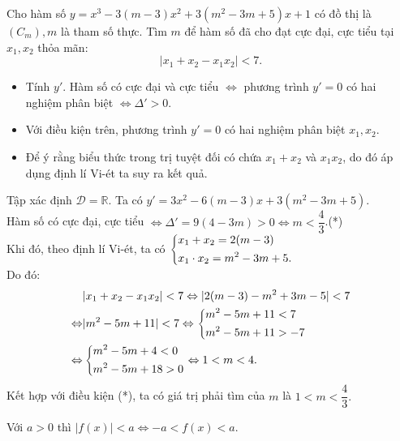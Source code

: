 \begin{bt}%
	Cho hàm số $y=x^3-3(m-3)x^2+3(m^2-3m+5)x+1$ có đồ thị là $(C_m), m$ là tham số thực. Tìm $m$ để hàm số đã cho đạt cực đại, cực tiểu tại $x_1, x_2$ thỏa mãn:
	$$|x_1 + x_2 - x_1x_2| < 7.$$
	\loigiai
	{
		\begin{itemize}
			\item Tính $y'$. Hàm số có cực đại và cực tiểu $\Leftrightarrow$ phương trình $y'=0$ có hai nghiệm phân biệt $\Leftrightarrow \Delta'>0$.
			\item Với điều kiện trên, phương trình $y'=0$ có hai nghiệm phân biệt $x_1, x_2$.
			\item Để ý rằng biểu thức trong trị tuyệt đối có chứa $x_1+x_2$ và $x_1x_2$, do đó áp dụng định lí Vi-ét ta suy ra kết quả.\end{itemize}
		  Tập xác định $\mathscr{D}=\mathbb{R}.$ Ta có
		$y'=3x^2-6(m-3)x+3(m^2-3m+5).$\\
		Hàm số có cực đại, cực tiểu $\Leftrightarrow \Delta' = 9(4-3m)>0 \Leftrightarrow m< \dfrac{4}{3}$.\hfill(*)\\
		Khi đó, theo định lí Vi-ét, ta có $\left\{\begin{aligned}&x_1 + x_2 = 2(m-3)\\&x_1\cdot x_2 = m^2-3m+5.\end{aligned}\right.$\\
		Do đó:
		{\allowdisplaybreaks
			\begin{align*}
			&|x_1 + x_2 - x_1x_2| < 7 \Leftrightarrow | 2(m-3) - m^2+3m-5|<7\\
			\Leftrightarrow&| m^2-5m+11|<7 \Leftrightarrow \left\{\begin{aligned}&m^2 - 5m + 11 < 7\\&m^2 - 5m + 11 >  - 7\end{aligned}\right.\\
			\Leftrightarrow& \left\{\begin{aligned}&m^2 - 5m + 4 < 0\\&m^2 - 5m + 18 > 0\end{aligned}\right.
			\Leftrightarrow 1 < m < 4.
			\end{align*}}
		Kết hợp với điều kiện (*), ta có giá trị phải tìm của $m$ là $1<m<\dfrac{4}{3}.$\\
	}
\end{bt}
\begin{note} Với $a>0$ thì $|f(x)| < a \Leftrightarrow -a<f(x)<a$.
\end{note}

